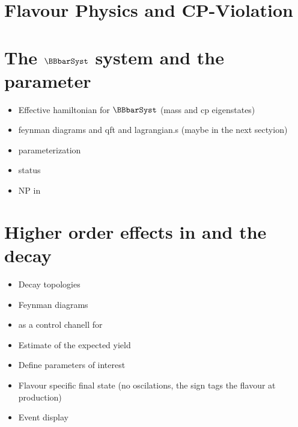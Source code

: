\section{Flavour Physics and CP-Violation}
\label{Flavour_Physics}



\section{The $\BBbarSyst$ system and the \phis parameter}
\label{Phenomenology}

\begin{itemize}
  \item Effective hamiltonian for $\BBbarSyst$ (mass and cp eigenstates)
  \item feynman diagrams and qft and lagrangian.s (maybe in the next sectyion)
  \item \phis parameterization
  \item \phis status
  \item NP in \phis
\end{itemize}

\section{Higher order effects in \phis and the \BsJpsiKst decay}
\label{TheBsJpsiKstDecay}

\begin{itemize}
\item Decay topologies
\item Feynman diagrams
\item \BsJpsiKst as a control chanell for \phis
\item Estimate of the expected yield
\item Define parameters of interest
\item Flavour specific final state (no oscilations, the sign tags the flavour at production)
\item Event display
\end{itemize}



